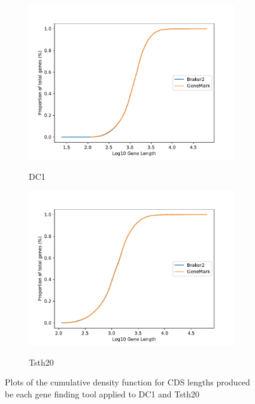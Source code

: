 \begin{figure}
  \centering
  \begin{subfigure}{0.7\textwidth}
    \includegraphics[width=\textwidth]{figures/dc1-cdf-lengths-log.pdf}
    \label{fig:dc1-lengths}
    \caption{DC1}
  \end{subfigure}
  \begin{subfigure}{0.7\textwidth}
    \includegraphics[width=\textwidth]{figures/tsth20-cdf-lengths-log.pdf}
    \label{fig:tsth20-lengths}
    \caption{Tsth20}
  \end{subfigure}
  \caption[CDF plots part 1.]{Plots of the cumulative density function
    for CDS lengths produced be each gene finding tool applied to DC1
    and Tsth20}
  \label{fig:cdf-lengths-1}
\end{figure}

